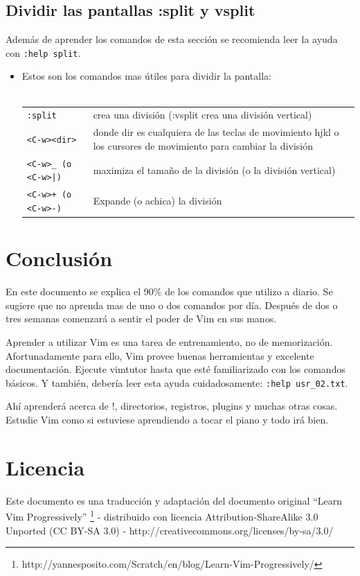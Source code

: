 \documentclass[12pt]{article}
\begin{document}
\subsection{Dividir las pantallas :split y vsplit}

Además de aprender los comandos de esta sección se recomienda leer la ayuda con \texttt{:help split}.

\begin{itemize}
	\item Estos son los comandos mas útiles para dividir la pantalla: \\ \\
\begin{tabular}{ l l }
	\texttt{:split} & crea una división (:vsplit crea una división vertical) \\
	\texttt{<C-w><dir>} & donde dir es cualquiera de las teclas de movimiento hjkl o los cursores de movimiento para cambiar la división \\
	\texttt{<C-w>\_ (o <C-w>|)} & maximiza el tamaño de la división (o la división vertical) \\
	\texttt{<C-w>+ (o <C-w>-)} & Expande (o achica) la división \\
\end{tabular}
\end{itemize}



\section{Conclusión}

En este documento se explica el 90\% de los comandos que utilizo a diario. Se sugiere que no aprenda mas de uno o dos comandos por día. Después de dos o tres semanas comenzará a sentir el poder de Vim en sus manos.

Aprender a utilizar Vim es una tarea de entrenamiento, no de memorización. Afortunadamente para ello, Vim 
provee buenas herramientas y excelente documentación. Ejecute vimtutor hasta que esté familiarizado con los comandos básicos. Y también, debería leer esta ayuda cuidadosamente:  \texttt{:help usr\_02.txt}.

Ahí aprenderá acerca de !, directorios, registros, plugins y muchas otras cosas. Estudie Vim como si estuviese aprendiendo a tocar el piano y todo irá bien.

\section{Licencia}
Este documento es una traducción y adaptación del documento
original ``Learn Vim Progressively''
\footnote{http://yannesposito.com/Scratch/en/blog/Learn-Vim-Progressively/}
 - distribuido con licencia
Attribution-ShareAlike 3.0 Unported (CC BY-SA 3.0) - 
http://creativecommons.org/licenses/by-sa/3.0/
\end{document}
